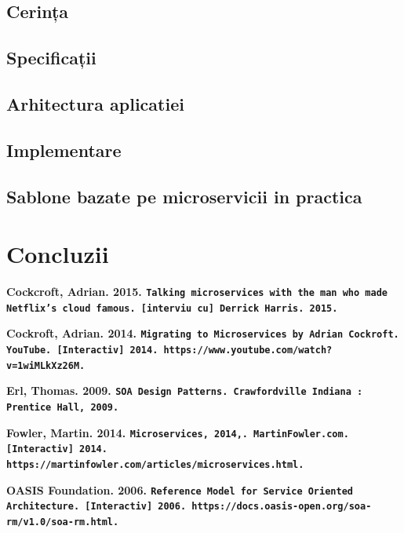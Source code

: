 \documentclass[12pt]{report}
\begin{document}
	\section{Cerința}
	\section{Specificații}
	\section{Arhitectura aplicatiei}
	\section{Implementare}
	\section{Sablone bazate pe microservicii in practica}
\chapter{Concluzii}




\begin{flushleft}
\textbf{Cockcroft, Adrian. 2015. \texttt{Talking microservices with the man who made Netflix’s cloud famous. [interviu cu] Derrick Harris. 2015.}}
\end{flushleft}

\begin{flushleft}
\textbf{
Cockroft, Adrian. 2014. \texttt{Migrating to Microservices by Adrian Cockroft. YouTube. [Interactiv] 2014. https://www.youtube.com/watch?v=1wiMLkXz26M.}}
\end{flushleft}

\begin{flushleft}
\textbf{
Erl, Thomas. 2009. \texttt{SOA Design Patterns. Crawfordville Indiana : Prentice Hall, 2009.}}
\end{flushleft}

\begin{flushleft}
\textbf{
Fowler, Martin. 2014. \texttt{Microservices, 2014,. MartinFowler.com. [Interactiv] 2014. https://martinfowler.com/articles/microservices.html.}}
\end{flushleft}

\begin{flushleft}
\textbf{
OASIS Foundation. 2006. \texttt{Reference Model for Service Oriented Architecture. [Interactiv] 2006. https://docs.oasis-open.org/soa-rm/v1.0/soa-rm.html.}}
\end{flushleft}
\end{document}
